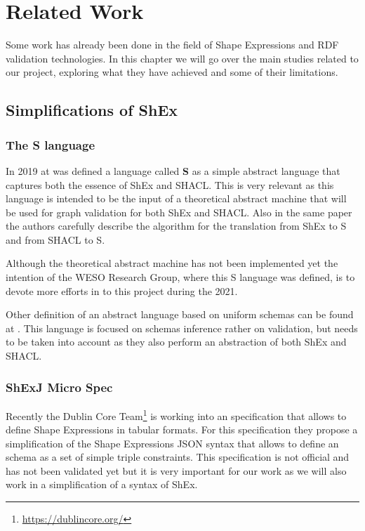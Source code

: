 \chapter{Related Work}
\label{ch:retalted-work}

Some work has already been done in the field of Shape Expressions and RDF validation
technologies. In this chapter we will go over the main studies related to our project,
exploring what they have achieved and some of their limitations.


\section{Simplifications of ShEx}
\label{sec:related-work-simplifications}

\subsection{The \textbf{S} language}

In 2019 at \cite{rdf-challenges} was defined a language called \textbf{S} as a simple abstract
language that captures both the essence of ShEx and SHACL. This is very relevant as this language
is intended to be the input of a theoretical abstract machine that will be used for graph validation
for both ShEx and SHACL. Also in the same paper the authors carefully describe the algorithm for the
translation from ShEx to S and from SHACL to S.

Although the theoretical abstract machine has not been implemented yet the intention of the WESO
Research Group, where this S language was defined, is to devote more efforts in to this project
during the 2021.

Other definition of an abstract language based on uniform schemas can be found at \cite{iovka-auto-shex-shacl}.
This language is focused on schemas inference rather on validation, but needs to be taken
into account as they also perform an abstraction of both ShEx and SHACL.

\subsection{ShExJ Micro Spec}
Recently the Dublin Core Team\footnote{\url{https://dublincore.org/}} is working into an
specification that allows to define Shape Expressions in tabular formats. For this specification
they propose a simplification of the Shape Expressions JSON syntax that allows to define an
schema as a set of simple triple constraints. This specification is not official and has
not been validated yet but it is very important for our work as we will also work in a
simplification of a syntax of ShEx.

